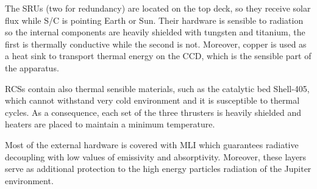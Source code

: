     The SRUs (two for redundancy) are located on the top deck, so they receive solar flux while S/C is pointing Earth or Sun. Their hardware is sensible to radiation so the internal components are heavily shielded with tungsten and titanium, the first is thermally conductive while the second is not. 
    Moreover, copper is used as a heat sink to transport thermal energy on the CCD, which is the sensible part of the apparatus.\cite{MAG_info}

    RCSs contain also thermal sensible materials, such as the catalytic bed Shell-405, which cannot withstand very cold environment and it is susceptible to thermal cycles. As a consequence, each set of the three thrusters is heavily shielded and heaters are placed to maintain a minimum temperature. \cite{Leros}

    Most of the external hardware is covered with MLI which guarantees radiative decoupling with low values of emissivity and absorptivity. Moreover, these layers serve as additional protection to the high energy particles radiation of the Jupiter environment.
  